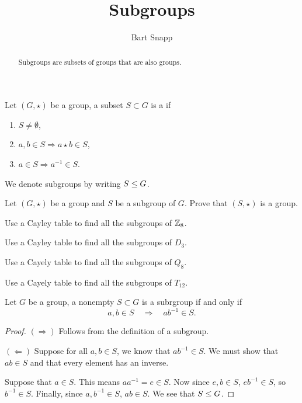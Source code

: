 \documentclass{ximera}
\author{Bart Snapp}
\title{Subgroups}
\begin{document}
\begin{abstract}
  Subgroups are subsets of groups that are also groups. 
\end{abstract}
\maketitle


\begin{definition}
  Let $(G,\star)$ be a group, a subset $S\subset G$ is a  if
  \begin{enumerate}
  \item $S \ne \emptyset$,
  \item $a,b\in S \Rightarrow a\star b\in S$,
  \item $a\in S \Rightarrow a^{-1}\in S$.
  \end{enumerate}
  We denote subgroups by writing $S\leq G$.
\end{definition}

\begin{exercise}
  Let $(G,\star)$ be a group and $S$ be a subgroup of $G$. Prove that
  $(S,\star)$ is a group.
\end{exercise}

\begin{exercise}
  Use a Cayley table to find all the subgroups of $\mathbb Z_8$.
\end{exercise}

\begin{exercise}
  Use a Cayley table to find all the subgroups of $D_3$.
\end{exercise}

\begin{exercise}
  Use a Cayely table to find all the subgroups of $Q_{8}$.
\end{exercise}

\begin{exercise}
  Use a Cayely table to find all the subgroups of $T_{12}$.
\end{exercise}


\begin{theorem}
  Let $G$ be a group, a nonempty $S\subset G$ is a subrgroup if and
  only if
  \[
  a,b\in S \quad \Rightarrow \quad ab^{-1}\in S.
  \]
  \begin{proof}
    $(\Rightarrow)$ Follows from the definition of a subgroup.

    $(\Leftarrow)$ Suppose for all $a,b\in S$, we know that
    $ab^{-1}\in S$. We must show that $ab\in S$ and that every element
    has an inverse.

    Suppose that $a\in S$. This means $aa^{-1} = e\in S$.  Now since
    $e,b\in S$, $eb^{-1}\in S$, so $b^{-1}\in S$.  Finally, since
    $a,b^{-1}\in S$, $ab\in S$. We see that $S\leq G$.
  \end{proof}
\end{theorem}
\end{document}
